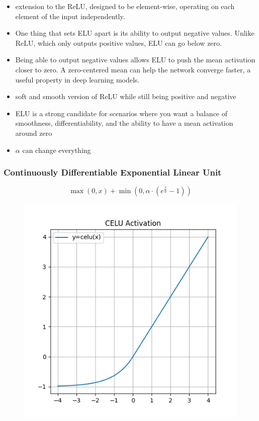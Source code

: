\documentclass[11pt]{article}
\begin{document}
\begin{itemize}
    \item extension to the ReLU, designed to be element-wise, operating on each element of the input independently.
    \item One thing that sets ELU apart is its ability to output negative values. Unlike ReLU, which only outputs positive values, ELU can go below zero.
    \item Being able to output negative values allows ELU to push the mean activation closer to zero. A zero-centered mean can help the network converge faster, a useful property in deep learning models.
    \item soft and smooth version of ReLU while still being positive and negative 
    \item ELU is a strong candidate for scenarios where you want a balance of smoothness, differentiability, and the ability to have a mean activation around zero
    \item $\alpha$ can change everything
\end{itemize}

\subsubsection{Continuously Differentiable Exponential Linear Unit}

\begin{definition}\label{eq:activation-celu}
    \begin{equation*}
        \max(0,x) + \min(0,\alpha \cdot (e^{\frac x \alpha} - 1))
    \end{equation*}
\end{definition}

\begin{figure}[H]
    \centering
    \includegraphics*[width=.4\linewidth]{figures/CELU Activation.png}\label{fig:celu}
\end{figure}
\end{document}
